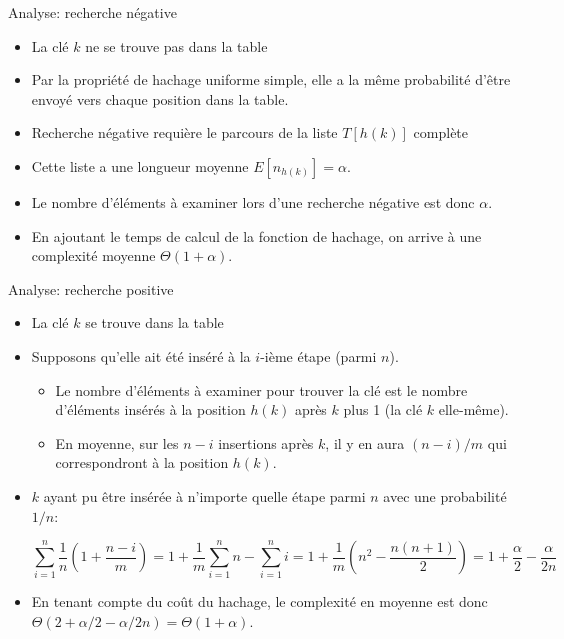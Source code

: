 \begin{frame}{Analyse: recherche négative}
\begin{itemize}
\item La clé $k$ ne se trouve pas dans la table
\item Par la propriété de hachage uniforme simple, elle a la même probabilité d'être envoyé vers chaque position dans la table.
\item Recherche négative requière le parcours de la liste $T[h(k)]$ complète
\item Cette liste a une longueur moyenne $E[n_{h(k)}]=\alpha$.
\item Le nombre d'éléments à examiner lors d'une recherche négative est donc $\alpha$.
\item En ajoutant le temps de calcul de la fonction de hachage, on arrive à une complexité moyenne $\Theta(1+\alpha)$.
\end{itemize}
\end{frame}


\begin{frame}{Analyse: recherche positive}

\begin{itemize}
\item La clé $k$ se trouve dans la table
\item Supposons qu'elle ait été inséré à la $i$-ième étape (parmi $n$).
\begin{itemize}
\item Le nombre d'éléments à examiner pour trouver la clé est le
  nombre d'éléments insérés à la position $h(k)$ après $k$ plus 1 (la clé $k$ elle-même). 
\item En moyenne, sur les $n-i$ insertions après $k$, il y en aura
  $(n-i)/m$ qui correspondront à la position $h(k)$.
\end{itemize}
\item $k$ ayant pu être insérée à n'importe quelle étape parmi $n$ avec une probabilité $1/n$:
\begin{small}
$$\sum_{i=1}^n \frac{1}{n} (1+\frac{n-i}{m})=1+\frac{1}{m} \sum_{i=1}^n n-\sum_{i=1}^n i=1+\frac{1}{m} (n^2-\frac{n(n+1)}{2})=1+\frac{\alpha}{2}-\frac{\alpha}{2n}$$
\end{small}
\item En tenant compte du coût du hachage, le complexité en moyenne
  est donc $\Theta(2+\alpha/2-\alpha/2n)=\Theta(1+\alpha)$.
\end{itemize}




\end{frame}

